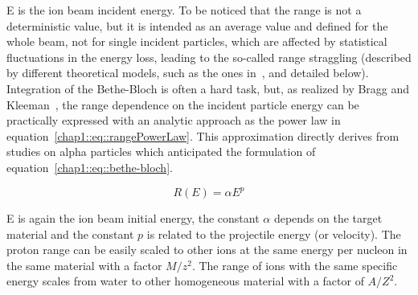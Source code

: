 E is the ion beam incident energy. To be noticed that the range is not a deterministic value, but it is intended as an average value and defined for the whole beam, not for single incident particles, which are affected by statistical fluctuations in the energy loss, leading to the so-called range straggling (described by different theoretical models, such as the ones in~\cite{Bohr1915, Landau1944, Vavilov1957}, and detailed below). Integration of the Bethe-Bloch is often a hard task, but, as realized by Bragg and Kleeman~\parencite{Bragg1905}, the range dependence on the incident particle energy can be practically expressed with an analytic approach as the power law in equation~\ref{chap1::eq::rangePowerLaw}. This approximation directly derives from studies on alpha particles which anticipated the formulation of equation~\ref{chap1::eq::bethe-bloch}.

\begin{equation}
R(E) = \alpha E^{p}
\label{chap1::eq::rangePowerLaw}
\end{equation}

E is again the ion beam initial energy, the constant $\alpha$ depends on the target material and the constant $p$ is related to the projectile energy (or velocity). The proton range can be easily scaled to other ions at the same energy per nucleon in the same material with a factor $M/z^{2}$. The range of ions with the same specific energy scales from water to other homogeneous material with a factor of $A/Z^{2}$.



 
 
